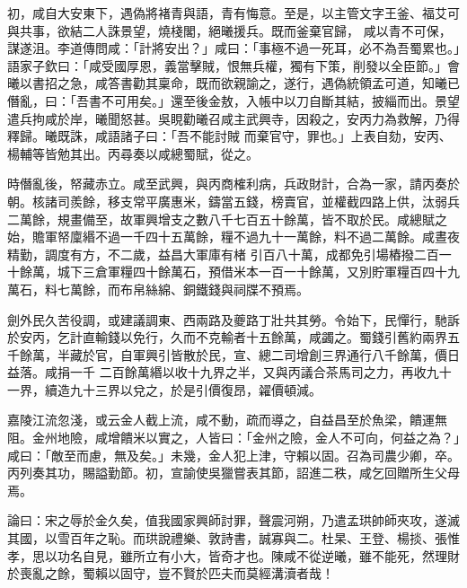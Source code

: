 \begin{pinyinscope}
 初，咸自大安東下，遇偽將褚青與語，青有悔意。至是，以主管文字王釜、福艾可與共事，欲結二人誅景望，燒棧閣，絕曦援兵。既而釜棄官歸，
 咸以青不可保，謀遂沮。李道傳問咸：「計將安出？」咸曰：「事極不過一死耳，必不為吾蜀累也。」語家子欽曰：「咸受國厚恩，義當擊賊，恨無兵權，獨有下策，削發以全臣節。」會曦以書招之急，咸答書勸其稟命，既而欲親諭之，遂行，遇偽統領孟可道，知曦已僭亂，曰：「吾書不可用矣。」還至後金敖，入帳中以刀自斷其結，披緇而出。景望遣兵拘咸於岸，曦聞怒甚。吳睍勸曦召咸主武興寺，因殺之，安丙力為救解，乃得釋歸。曦既誅，咸語諸子曰：「吾不能討賊
 而棄官守，罪也。」上表自劾，安丙、楊輔等皆勉其出。丙尋奏以咸總蜀賦，從之。



 時僭亂後，帑藏赤立。咸至武興，與丙商榷利病，兵政財計，合為一家，請丙奏於朝。核諸司羨餘，移支常平廣惠米，鑄當五錢，榜賣官，並權截四路上供，汰弱兵二萬餘，規畫備至，故軍興增支之數八千七百五十餘萬，皆不取於民。咸總賦之始，贍軍帑廩緡不過一千四十五萬餘，糧不過九十一萬餘，料不過二萬餘。咸晝夜精勤，調度有方，不二歲，益昌大軍庫有楮
 引百八十萬，成都免引場樁撥二百一十餘萬，城下三倉軍糧四十餘萬石，預借米本一百一十餘萬，又別貯軍糧百四十九萬石，料七萬餘，而布帛絲綿、銅鐵錢與祠牒不預焉。



 劍外民久苦役調，或建議調東、西兩路及夔路丁壯共其勞。令始下，民憚行，馳訴於安丙，乞計直輸錢以免行，久而不克輸者十五餘萬，咸蠲之。蜀錢引舊約兩界五千餘萬，半藏於官，自軍興引皆散於民，宣、總二司增創三界通行八千餘萬，價日益落。咸捐一千
 二百餘萬緡以收十九界之半，又與丙議合茶馬司之力，再收九十一界，續造九十三界以兌之，於是引價復昂，糴價頓減。



 嘉陵江流忽淺，或云金人截上流，咸不動，疏而導之，自益昌至於魚梁，饋運無阻。金州地險，咸增饋米以實之，人皆曰：「金州之險，金人不可向，何益之為？」咸曰：「敵至而慮，無及矣。」未幾，金人犯上津，守賴以固。召為司農少卿，卒。丙列奏其功，賜謚勤節。初，宣諭使吳獵嘗表其節，詔進二秩，咸乞回贈所生父母焉。



 論曰：宋之辱於金久矣，值我國家興師討罪，聲震河朔，乃遣孟珙帥師夾攻，遂滅其國，以雪百年之恥。而珙說禮樂、敦詩書，誠寡與二。杜杲、王登、楊掞、張惟孝，思以功名自見，雖所立有小大，皆奇才也。陳咸不從逆曦，雖不能死，然理財於喪亂之餘，蜀賴以固守，豈不賢於匹夫而莫經溝瀆者哉！



\end{pinyinscope}
